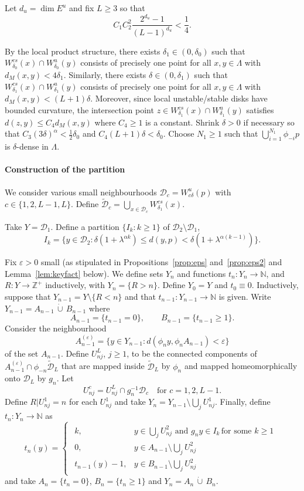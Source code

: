 \documentclass[12pt]{article}
\numberwithin{equation}{section}
\newcommand{\Z}{{\mathbb Z}}
\newcommand{\N}{{\mathbb N}}
\newcommand{\cD}{{\mathcal D}}
\newcommand{\tcD}{{\widetilde {\mathcal D}}}
\newcommand{\eps}{\varepsilon}
\begin{document}
Let $d_u=\dim E^u$ and
fix $L\ge3$ so that 
\begin{equation}\label{eq:L}
C_1C_2^2\frac{2^{d_u}-1}{(L-1)^{d_u}}<\frac14 .
\end{equation}

By the local product structure, there exists $\delta_1\in(0,\delta_0)$ such that
$W^{cs}_{\delta_0}(x)\cap W^u_{\delta_0}(y)$ consists of precisely one point for
all $x,y\in\Lambda$ with $d_M(x,y)<4\delta_1$. Similarly, there exists $\delta\in(0,\delta_1)$ such that
$W^{cs}_{\delta_1}(x)\cap W^u_{\delta_1}(y)$ consists of precisely one point for
all $x,y\in\Lambda$ with $d_M(x,y)<(L+1)\delta$.
Moreover, since local unstable/stable disks have bounded curvature, the intersection point $z\in W^{cs}_{\delta_1}(x)\cap W^u_{\delta_1}(y)$ satisfies $d(z,y)\le C_4d_M(x,y)$ where $C_4\ge1$ is a constant.
Shrink $\delta>0$ if necessary so that $C_3(3\delta)^\alpha<\frac12\delta_0$ and $C_4(L+1)\delta<\delta_0$.
Choose
$N_1\ge1$ such that $\bigcup_{i=1}^{N_1} \phi_{-i}p$ is $\delta$-dense in $\Lambda$.

\paragraph{Construction of the partition}

We consider various small neighbourhoods $\cD_c=W^u_{c\delta}(p)$ with $c\in\{1,2,L-1,L\}$.
Define $\tcD_c=\bigcup_{x\in \cD_c}W^{cs}_{\delta_1}(x)$.

Take $Y=\cD_1$.
Define a partition $\{I_k:k\ge1\}$ of $\cD_2\setminus \cD_1$,
\[
I_k=\big\{y\in \cD_2: \delta(1+\lambda^{\alpha k}) \le d(y,p) < \delta(1+\lambda^{\alpha(k-1)})\big\}.
\]

Fix $\eps>0$ small (as stipulated in Propositions~\ref{prop:eps} and~\ref{prop:eps2} and Lemma~\ref{lem:keyfact} below). 
We define sets $Y_n$ and functions 
$t_n:Y_n\to\N$, and $R:Y\to \Z^+$ inductively, with
$Y_n=\{R> n\}$.
Define $Y_0=Y$ and $t_0\equiv 0$. 
Inductively, suppose that $Y_{n-1}=Y\setminus\{R<n\}$ and that $t_{n-1}:Y_{n-1}\to\N$ is given. Write $Y_{n-1}=A_{n-1}\,\dot\cup\,B_{n-1}$ where
\[
A_{n-1}=\{t_{n-1}=0\}, \qquad
B_{n-1}=\{t_{n-1}\ge1\}.
\]
Consider the neighbourhood 
\[
A^{(\eps)}_{n-1}=\big\{y\in Y_{n-1}: d(\phi_ny,\phi_nA_{n-1})<\eps\big\}
\]
 of the set $A_{n-1}$.
Define $U_{nj}^L$, $j\ge1$, to be the connected components of $A^{(\eps)}_{n-1}\cap \phi_{-n}\tcD_L$ that are mapped inside $\tcD_L$ by $\phi_n$ and mapped homeomorphically onto $\cD_L$ by $g_n$. 
Let
\[
U_{nj}^c=U_{nj}^L\cap g_n^{-1}\cD_c \quad\text{for $c=1,2,L-1$.}
\]
Define $R|U_{nj}^1=n$ for each $U_{nj}^1$ and take $Y_n=Y_{n-1}\setminus \bigcup_j U_{nj}^1$.
Finally, define $t_n:Y_n\to\N$ as
\[
t_n(y) =
\begin{cases}
\begin{array}{cl}
k, & y\in \bigcup_j U_{nj}^2 \text{ and } g_ny\in I_k \, \text{for some $k\ge 1$}\\
0, & y\in A_{n-1} \setminus \bigcup_j U_{nj}^2 \\
t_{n-1}(y)-1, & y\in B_{n-1} \setminus \bigcup_j U_{nj}^2
\end{array}
\end{cases}
\]
and take $A_n=\{t_n=0\}$, 
$B_n=\{t_n\ge1\}$ and $Y_n = A_n\,\dot\cup\,B_n$.
\end{document}
